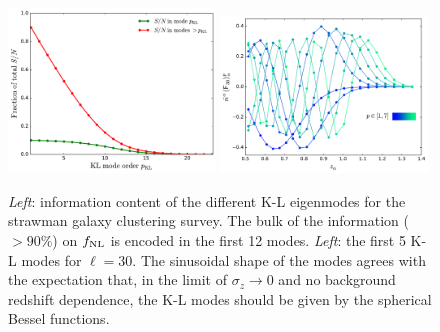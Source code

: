 \documentclass[twocolumn,amsfont,amssymb,amsmath, showpacs,balancelastpage, nofootinbib]{revtex4-1}
\begin{document}
    \begin{figure}
      \centering
      \includegraphics[width=0.49\textwidth]{Figs/information_gc}
      \includegraphics[width=0.49\textwidth]{Figs/kl_modes_gc}
      \caption{{\sl Left}: information content of the different K-L eigenmodes for the strawman galaxy clustering survey. The bulk of the information ($>90\%$) on $f_{\rm NL}$ is encoded in the first 12 modes. {\sl Left}: the first 5 K-L modes for $\ell=30$. The sinusoidal shape of the modes agrees with the expectation that, in the limit of $\sigma_z\rightarrow0$ and no background redshift dependence, the K-L modes should be given by the spherical Bessel functions. }\label{fig:kl_gc}
    \end{figure}    
\end{document}
